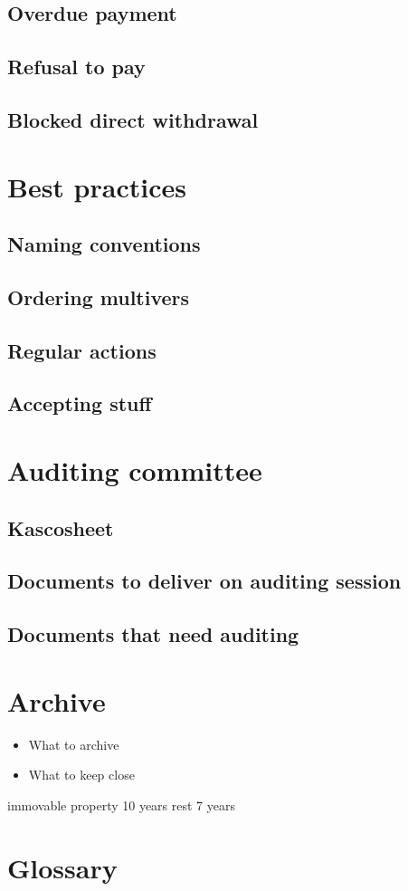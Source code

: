 \documentclass{report}
\begin{document}
\subsection{Overdue payment}
\subsection{Refusal to pay}
\subsection{Blocked direct withdrawal}
\section{Best practices}
\subsection{Naming conventions}
\subsection{Ordering multivers}
\subsection{Regular actions}
\subsection{Accepting stuff}
\section{Auditing committee}
\subsection{Kascosheet}
\subsection{Documents to deliver on auditing session}
\subsection{Documents that need auditing}
\section{Archive}
\begin{itemize}
	\item What to archive
	\item What to keep close
\end{itemize}
immovable property 10 years
rest 7 years
\section{Glossary}
\end{document}
